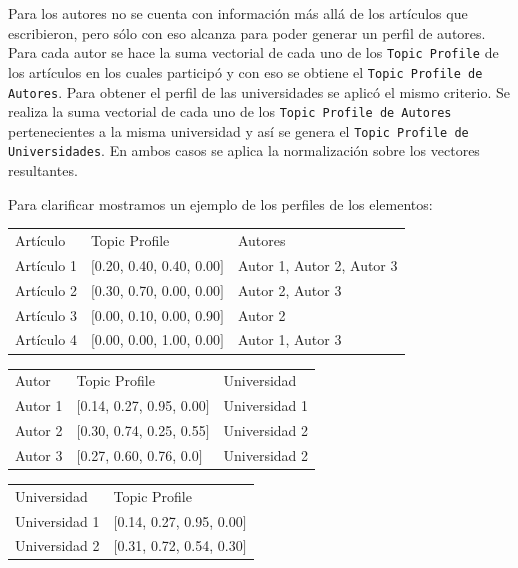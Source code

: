 Para los autores no se cuenta con información más allá de los artículos que escribieron, pero sólo con eso alcanza para poder generar un perfil de autores. Para cada autor se hace la suma vectorial de cada uno de los \texttt{Topic Profile} de los artículos en los cuales participó y con eso se obtiene el \texttt{Topic Profile de Autores}. Para obtener el perfil de las universidades se aplicó el mismo criterio. Se realiza la suma vectorial de cada uno de los \texttt{Topic Profile de Autores} pertenecientes a la misma universidad y así se genera el \texttt{Topic Profile de Universidades}. En ambos casos se aplica la normalización sobre los vectores resultantes.

Para clarificar mostramos un ejemplo de los perfiles de los elementos:

\begin{table}[H]
\begin{tabular}{lll}
	Artículo & Topic Profile & Autores \\
	Artículo 1 & $[$0.20, 0.40, 0.40, 0.00$]$ & Autor 1, Autor 2, Autor 3 \\
	Artículo 2 & $[$0.30, 0.70, 0.00, 0.00$]$ & Autor 2, Autor 3 \\
	Artículo 3 & $[$0.00, 0.10, 0.00, 0.90$]$ & Autor 2 \\
	Artículo 4 & $[$0.00, 0.00, 1.00, 0.00$]$ & Autor 1, Autor 3 \\
\end{tabular}
\label{tabla:topicProfileEj1}
\end{table}

\begin{table}[H]
\begin{tabular}{lll}
	Autor & Topic Profile & Universidad \\
	Autor 1 & $[$0.14, 0.27, 0.95, 0.00$]$ & Universidad 1 \\
	Autor 2 & $[$0.30, 0.74, 0.25, 0.55$]$ & Universidad 2 \\
	Autor 3 & $[$0.27, 0.60, 0.76, 0.0$]$ & Universidad 2 \\
\end{tabular}
\label{tabla:topicProfileEj2}
\end{table}

\begin{table}[H]
\begin{tabular}{ll}
	Universidad & Topic Profile \\
	Universidad 1 & $[$0.14, 0.27, 0.95, 0.00$]$ \\
	Universidad 2 & $[$0.31, 0.72, 0.54, 0.30$]$ \\
\end{tabular}
\label{tabla:topicProfileEj3}
\end{table}

